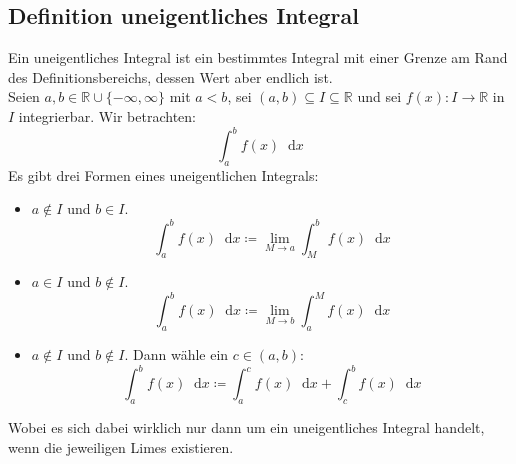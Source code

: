 \documentclass[halfparscip]{scrartcl}
\newcommand*\dif{\mathop{}\!\mathrm{d}}
\newcounter{subsection2}
\begin{document}
\subsection*{Definition uneigentliches Integral}
Ein uneigentliches Integral ist ein bestimmtes Integral mit einer Grenze am Rand des Definitionsbereichs, dessen Wert aber endlich ist.\\
Seien $a, b \in \mathbb{R} \cup \{-\infty, \infty\}$ mit $a < b$, sei $(a, b) \subseteq I \subseteq \mathbb{R}$ und 
sei $f(x) : I \rightarrow \mathbb{R}$ in $I$ integrierbar. Wir betrachten:
\begin{equation*}
	\int_a^b f(x) \dif x
\end{equation*}
Es gibt drei Formen eines uneigentlichen Integrals:
\begin{itemize}
	\item $a \notin I$ und $b \in I$.
	\begin{equation*}
		\int_{a}^{b} f(x) \dif x \coloneqq \lim_{M \rightarrow a} \int_{M}^{b} f(x) \dif x
	\end{equation*}
	\item $a \in I$ und $b \notin I$.
	\begin{equation*}
		\int_{a}^{b} f(x) \dif x \coloneqq \lim_{M \rightarrow b} \int_{a}^{M} f(x) \dif x
	\end{equation*}
	\item $a \notin I$ und $b \notin I$. Dann wähle ein $c \in (a, b)$:
	\begin{equation*}
		\int_{a}^{b} f(x) \dif x \coloneqq \int_{a}^{c} f(x) \dif x + \int_c^b f(x) \dif x
	\end{equation*}
\end{itemize}
Wobei es sich dabei wirklich nur dann um ein uneigentliches Integral handelt, wenn die jeweiligen Limes existieren.

\appendix
\end{document}
